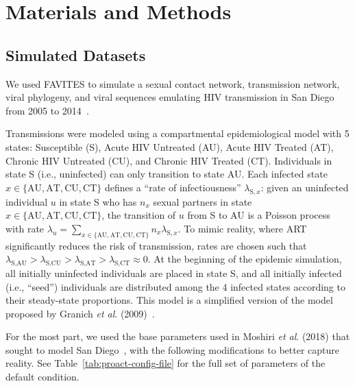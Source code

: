 \section{Materials and Methods}
\subsection{Simulated Datasets}
We used FAVITES to simulate a sexual contact network, transmission network, viral phylogeny, and viral sequences emulating \gls{HIV} transmission in San Diego from 2005 to 2014~\cite{Moshiri2018}.

Transmissions were modeled using a compartmental epidemiological model with 5 states: Susceptible (S), Acute \gls{HIV} Untreated (AU), Acute \gls{HIV} Treated (AT), Chronic \gls{HIV} Untreated (CU), and Chronic \gls{HIV} Treated (CT). Individuals in state S (i.e., uninfected) can only transition to state AU. Each infected state $x\in\{\text{AU},\text{AT},\text{CU},\text{CT}\}$ defines a ``rate of infectiousness'' $\lambda_{\text{S},x}$: given an uninfected individual $u$ in state S who has $n_x$ sexual partners in state $x\in\{\text{AU},\text{AT},\text{CU},\text{CT}\}$, the transition of $u$ from S to AU is a Poisson process with rate $\lambda_u=\sum_{x\in\{\text{AU},\text{AT},\text{CU},\text{CT}\}}{n_{x}\lambda_{\text{S},x}}$. To mimic reality, where ART significantly reduces the risk of transmission, rates are chosen such that $\lambda_{\text{S},\text{AU}} > \lambda_{\text{S},\text{CU}} > \lambda_{\text{S},\text{AT}} > \lambda_{\text{S},\text{CT}} \approx 0$. At the beginning of the epidemic simulation, all initially uninfected individuals are placed in state S, and all initially infected (i.e., ``seed'') individuals are distributed among the 4 infected states according to their steady-state proportions. This model is a simplified version of the model proposed by Granich \textit{et al}. (2009)~\cite{Granich2009}.

For the most part, we used the base parameters used in Moshiri \textit{et al}. (2018) that sought to model San Diego~\cite{Moshiri2018}, with the following modifications to better capture reality. See Table~\ref{tab:proact-config-file} for the full set of parameters of the default condition.

